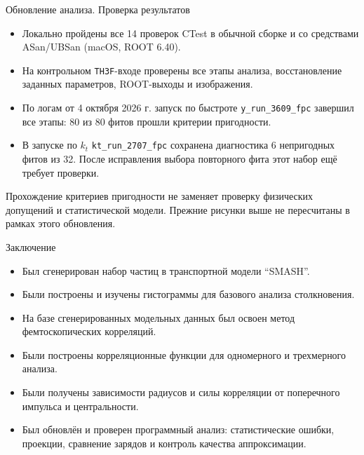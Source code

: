 \begin{frame}{Обновление анализа. Проверка результатов}
    \small
    \begin{itemize}
        \item Локально пройдены все 14 проверок CTest в обычной сборке
              и со средствами ASan/UBSan (macOS, ROOT 6.40).
        \item На контрольном \texttt{TH3F}-входе проверены все этапы анализа,
              восстановление заданных параметров, ROOT-выходы и изображения.
        \item По логам от 4 октября 2026 г. запуск по быстроте
              \texttt{y\_run\_3609\_fpc} завершил все этапы:
              80 из 80 фитов прошли критерии пригодности.
        \item В запуске по $k_t$ \texttt{kt\_run\_2707\_fpc} сохранена диагностика
              6 непригодных фитов из 32. После исправления выбора повторного
              фита этот набор ещё требует проверки.
    \end{itemize}
    Прохождение критериев пригодности не заменяет проверку физических
    допущений и статистической модели. Прежние рисунки выше не пересчитаны
    в рамках этого обновления.
\end{frame}


\begin{frame}{Заключение}
    \begin{itemize}
	\item Был сгенерирован набор частиц в транспортной модели “SMASH”.
        \item Были построены и изучены гистограммы для базового анализа столкновения.
        \item На базе сгенерированных модельных данных был освоен метод фемтоскопических корреляций.
        \item Были построены корреляционные функции для одномерного и трехмерного анализа.
        \item Были получены зависимости радиусов и силы корреляции от поперечного импульса и центральности.
        \item Был обновлён и проверен программный анализ: статистические ошибки,
              проекции, сравнение зарядов и контроль качества аппроксимации.
    \end{itemize}
\end{frame}

